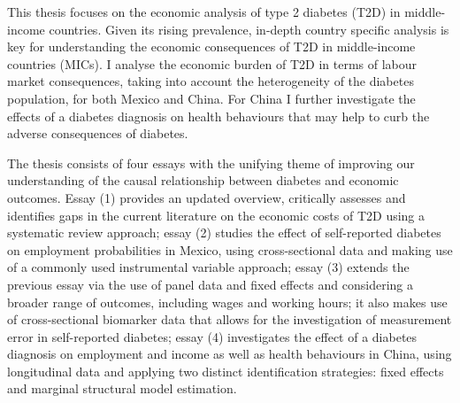 This thesis focuses on the economic analysis of type 2 diabetes (T2D) in middle-income countries. Given its rising prevalence, in-depth country specific analysis is key for understanding the economic consequences of T2D in middle-income countries (MICs). I analyse the economic burden of T2D in terms of labour market consequences, taking into account the heterogeneity of the diabetes population, for both Mexico and China. For China I further investigate the effects of a diabetes diagnosis on health behaviours that may help to curb the adverse consequences of diabetes.

The thesis consists of four essays with the unifying theme of improving our understanding of the causal relationship between diabetes and economic outcomes. Essay (1) provides an updated overview, critically assesses and identifies gaps in the current literature on the economic costs of T2D using a systematic review approach; essay (2) studies the effect of self-reported diabetes on employment probabilities in Mexico, using cross-sectional data and making use of a commonly used instrumental variable approach; essay (3) extends the previous essay via the use of panel data and fixed effects and considering a broader range of outcomes, including wages and working hours; it also makes use of cross-sectional biomarker data that allows for the investigation of measurement error in self-reported diabetes; essay (4) investigates the effect of a diabetes diagnosis on employment and income as well as health behaviours in China, using longitudinal data and applying two distinct identification strategies: fixed effects and marginal structural model estimation.

